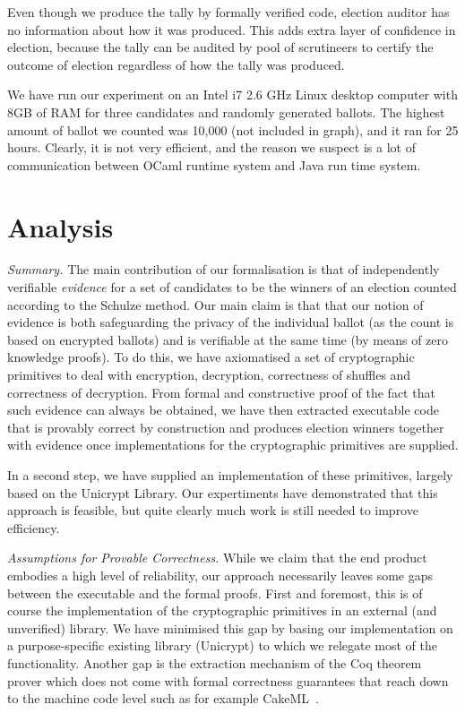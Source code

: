 \documentclass{llncs}
\begin{document}
Even though we produce the tally by formally verified code, election 
auditor has no information about how it was produced. This adds extra layer
of confidence in election, because the tally can be audited by pool
of scrutineers to certify the outcome of election regardless of how the tally 
was produced.


We have run our experiment on an  Intel  i7  2.6  GHz  Linux  desktop  computer
with  8GB  of  RAM for three candidates and randomly generated ballots. The 
highest amount of ballot we counted was 10,000 (not included in graph), and 
it ran for 25 hours. Clearly, it is not very efficient, and the reason we 
suspect is a lot of communication between OCaml runtime system 
and Java run time system.

\section{Analysis}

\noindent\emph{Summary.} The main contribution of our formalisation is that of independently
verifiable \emph{evidence} for a set of candidates to be the winners
of an election counted according to the Schulze method. Our main
claim is that that our notion of evidence is both safeguarding the
privacy of the individual ballot (as the count is based on encrypted
ballots) and is verifiable at the same time (by means of zero
knowledge proofs). To do this, we have axiomatised a set of
cryptographic primitives to deal with encryption, decryption,
correctness of shuffles and correctness of decryption. From formal
and constructive proof of the fact that such evidence can always be
obtained, we have then extracted executable code that is provably
correct by construction and produces election winners together with
evidence once implementations for the cryptographic primitives are
supplied.

In a second step, we have supplied an implementation of these
primitives, largely based on the Unicrypt Library. Our expertiments
have demonstrated that this approach is feasible, but quite clearly
much work is still needed to improve efficiency. 

\smallskip\noindent\emph{Assumptions for Provable Correctness.}
While we claim that the end product embodies a high level of
reliability, our approach necessarily leaves some gaps between the
executable and the formal proofs. First and foremost, this is of
course the implementation of the cryptographic primitives in an
external (and unverified) library. We have minimised this gap by
basing our implementation on a purpose-specific existing library
(Unicrypt) to which we relegate most of the functionality. Another
gap is the extraction mechanism of the Coq theorem prover which does
not come with formal correctness guarantees that reach down to the
machine code level such as for example CakeML~\cite{Kumar:2014:CVI}.
\end{document}

